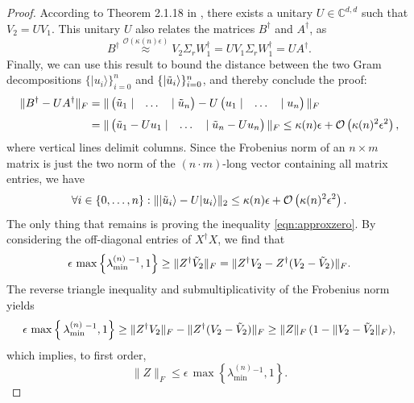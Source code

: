 \begin{proof}
According to Theorem 2.1.18 in \cite{Horn2013}, there exists a unitary $U\in\mathbb{C}^{d,d}$ such that $V_2=UV_1$. This unitary $U$ also relates the matrices $B^{\dag}$ and $A^{\dag}$, as
\begin{equation*}
B^{\dag}\stackrel{\mathcal{O}(\kappa(n)\epsilon)}{\approx}V_2\Sigma_r W_1^{\dag}= UV_1\Sigma_r W_1^{\dag}=UA^{\dag}.
\end{equation*} 
Finally, we can use this result to bound the distance between the two Gram decompositions $\{\vert u_i \rangle \}_{i=0}^n$ and $\{\vert \Tilde{u}_i \rangle \}_{i=0}^n$, and thereby conclude the proof:
\begin{align*}
\|B^{\dag}-UA^{\dag}\|_F&=\|
\begin{pmatrix}
\Tilde{u}_1 \;| & \dots & |\; \Tilde{u}_n
\end{pmatrix}-U
\begin{pmatrix}
u_1 \;| & \dots &  | \; u_n
\end{pmatrix} \|_F \\[0.3em]
& = \|
\begin{pmatrix}
\Tilde{u}_1-U u_1\; | &\dots& |\;\Tilde{u}_n-U u_n
\end{pmatrix}
\|_F\leq\kappa(n)\epsilon + \mathcal{O}\left(\kappa(n)^2\epsilon^2\right),
\end{align*}
where vertical lines delimit columns.
Since the Frobenius norm of an $n\times m$ matrix is just the two norm of the $(n\cdot m)$-long vector containing all matrix entries, we have
\begin{equation*}
\forall i\in\{0,\dots,n\}: \|\vert\Tilde{u}_i\rangle-U\vert u_i\rangle\|_2 \leq \kappa(n)\epsilon + \mathcal{O}\left(\kappa(n)^2\epsilon^2\right).
\end{equation*}
The only thing that remains is proving the inequality \ref{eqn:approxzero}. By considering the off-diagonal entries of $X^{\dag}X$, we find that
\begin{equation*}
\epsilon\, \max\left\lbrace\lambda_{\text{min}}^{(n)}{}^{-1},1\right\rbrace \geq \|Z^{\dag}\Tilde{V}_2\|_F=\|Z^{\dag}V_2 - Z^{\dag}(V_2-\Tilde{V}_2)\|_F.
\end{equation*}
The reverse triangle inequality and submultiplicativity of the Frobenius norm yields
\begin{equation*}
\epsilon\,\max\left\lbrace\thinspace\lambda_{\text{min}}^{(n)}{}^{-1},1\right\rbrace \geq \|Z^{\dag}V_2\|_F - \|Z^{\dag}(V_2-\Tilde{V}_2)\|_F \geq \|Z\|_F\,(1-\|V_2-\Tilde{V}_2\|_F),
\end{equation*}
which implies, to first order,
\begin{equation*}
\|Z\|_F \leq
\epsilon\, \max\left\lbrace \lambda_{\text{min}}^{(n)}{}^{-1},1\right\rbrace.
\end{equation*}
\end{proof}

